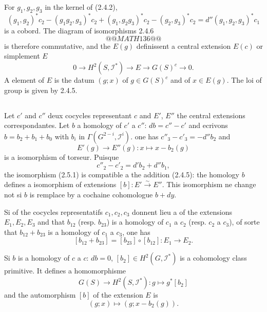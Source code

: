 \documentclass[11pt,a4paper]{article}
\theoremstyle{plain}
\theoremstyle{definition}
\begin{document}
For $g_1, g_2, g_3$ in the kernel of (2.4.2),
\[
(g_1, g_2)^* c_2 - (g_1 g_2, g_3)^* c_2 + (g_1, g_2 g_3)^* c_2 - (g_2, g_3)^* c_2 = d''(g_1, g_2, g_3)^* c_1
\]
is a cobord. The diagram of isomorphisms 2.4.6
\[
@@MATH136@@
\]
is therefore commutative, and the $E(g)$ definissent a central extension $E(c)$ or simplement $E$
\begin{equation}\label{2.4.7}
0 \to H^2(S, \mathscr{I}^*) \to E \to G(S)^c \to 0.
\end{equation}
A element of $E$ is the datum $(g; x)$ of $g \in G(S)^c$ and of $x \in E(g)$. The loi of group is given by 2.4.5.

\subsection{}\label{2.5}

Let $c'$ and $c''$ deux cocycles representant $c$ and $E'$, $E''$ the central extensions correspondantes. Let $b$ a homology of $c'$ a $c''$: $d b = c'' - c'$ and ecrivons $b = b_2 + b_1 + b_0$ with $b_i$ in $\Gamma(G^{2-i}, \mathscr{I}^i)$. one has $c''_3 - c'_3 = -d'' b_2$ and
\begin{equation}\label{2.5.1}
E'(g) \to E''(g) : x \mapsto x - b_2(g)
\end{equation}
is a isomorphism of torseur. Puisque
\[
c''_2 - c'_2 = d' b_2 + d'' b_1,
\]
the isomorphism (2.5.1) is compatible a the addition (2.4.5): the homology $b$ defines a isomorphism of extensions $[b] : E' \xrightarrow{\sim} E''$. This isomorphism ne change not si $b$ is remplace by a cochaine cohomologue $b + dy$.

Si of the cocycles representatifs $c_1, c_2, c_3$ donnent lieu a of the extensions $E_1, E_2, E_3$ and that $b_{12}$ (resp. $b_{23}$) is a homology of $c_1$ a $c_2$ (resp. $c_2$ a $c_3$), of sorte that $b_{12} + b_{23}$ is a homology of $c_1$ a $c_3$, one has
\begin{equation}\label{2.5.2}
[b_{12} + b_{23}] = [b_{23}] \circ [b_{12}] : E_1 \to E_2.
\end{equation}

Si $b$ is a homology of $c$ a $c$: $d b = 0$, $[b_2] \in H^2(G, \mathscr{I}^*)$ is a cohomology class primitive. It defines a homomorphisme
\begin{equation}\label{2.5.3}
G(S) \to H^2(S, \mathscr{I}^*) : g \mapsto g^*[b_2]
\end{equation}
and the automorphism $[b]$ of the extension $E$ is
\begin{equation}\label{2.5.4}
(g; x) \mapsto (g; x - b_2(g)).
\end{equation}
\end{document}
